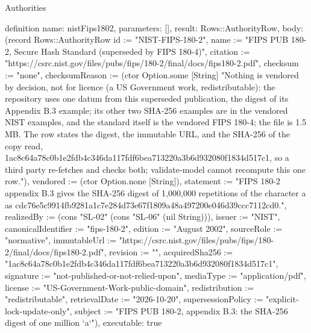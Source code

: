 \begin{lexlean}{Authorities}
\begin{semanticmodule}
definition{
  name: nistFips1802,
  parameters: [],
  result: Rows::AuthorityRow,
  body: (record Rows::AuthorityRow {id := "NIST-FIPS-180-2", name := "FIPS PUB 180-2, Secure Hash Standard (superseded by FIPS 180-4)", citation := "https://csrc.nist.gov/files/pubs/fips/180-2/final/docs/fips180-2.pdf", checksum := "none", checksumReason := (ctor Option.some [String] "Nothing is vendored by decision, not for licence (a US Government work, redistributable): the repository uses one datum from this superseded publication, the digest of its Appendix B.3 example; its other two SHA-256 examples are in the vendored NIST examples, and the standard itself is the vendored FIPS 180-4; the file is 1.5 MB. The row states the digest, the immutable URL, and the SHA-256 of the copy read, 1ac8c64a78c0b1e2fdb4c346da117fdf6bea713220a3b6d932080f1834d517c1, so a third party re-fetches and checks both; validate-model cannot recompute this one row."), vendored := (ctor Option.none [String]), statement := "FIPS 180-2 appendix B.3 gives the SHA-256 digest of 1,000,000 repetitions of the character a as cdc76e5c9914fb9281a1c7e284d73e67f1809a48a497200e046d39ccc7112cd0.", realizedBy := (cons "SL-02" (cons "SL-06" (nil String))), issuer := "NIST", canonicalIdentifier := "fips-180-2", edition := "August 2002", sourceRole := "normative", immutableUrl := "https://csrc.nist.gov/files/pubs/fips/180-2/final/docs/fips180-2.pdf", revision := "", acquiredSha256 := "1ac8c64a78c0b1e2fdb4c346da117fdf6bea713220a3b6d932080f1834d517c1", signature := "not-published-or-not-relied-upon", mediaType := "application/pdf", license := "US-Government-Work-public-domain", redistribution := "redistributable", retrievalDate := "2026-10-20", supersessionPolicy := "explicit-lock-update-only", subject := "FIPS PUB 180-2, appendix B.3: the SHA-256 digest of one million `a`"}),
  executable: true
}


\end{semanticmodule}
\end{lexlean}
